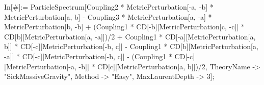 In[#]:= ParticleSpectrum[Coupling2 * MetricPerturbation[-a, -b] * MetricPerturbation[a, b] - Coupling3 * MetricPerturbation[a, -a] * MetricPerturbation[b, -b] + (Coupling1 * CD[-b][MetricPerturbation[c, -c]] * CD[b][MetricPerturbation[a, -a]])/2 + Coupling1 * CD[-a][MetricPerturbation[a, b]] * CD[-c][MetricPerturbation[-b, c]] - Coupling1 * CD[b][MetricPerturbation[a, -a]] * CD[-c][MetricPerturbation[-b, c]] - (Coupling1 * CD[-c][MetricPerturbation[-a, -b]] * CD[c][MetricPerturbation[a, b]])/2, TheoryName -> "SickMassiveGravity", Method -> "Easy", MaxLaurentDepth -> 3]; 